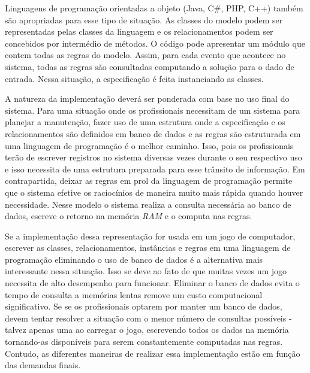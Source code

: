 Linguagens de programação orientadas a objeto (Java, C$\#$, PHP, C++) também são apropriadas para esse tipo de situação. As classes do modelo podem ser representadas pelas classes da linguagem e os relacionamentos podem ser concebidos por intermédio de métodos. O código pode apresentar um módulo que contem todas as regras do modelo. Assim, 
para cada evento que acontece no sistema, todas as regras são consultadas computando a solução para o dado de entrada. Nessa situação, a especificação é feita instanciando as classes. 

A natureza da implementação deverá ser ponderada com base no uso final do sistema. Para uma situação onde os profissionais necessitam de um sistema para planejar a manutenção, fazer uso de uma estrutura onde a especificação e os relacionamentos são definidos em banco de dados e as regras são estruturada em uma linguagem de programação é o melhor caminho. Isso, pois os profissionais terão de escrever registros no sistema diversas vezes durante o seu respectivo uso e isso necessita de uma estrutura preparada para esse trânsito de informação. Em contrapartida, deixar as regras em prol da linguagem de programação permite que o sistema efetive os raciocínios de maneira muito mais rápida quando houver necessidade. Nesse modelo o sistema realiza a consulta necessária ao banco de dados, escreve o retorno na memória \textit{RAM} e o computa
nas regras. 

Se a implementação dessa representação for usada em um jogo de computador, escrever as classes, relacionamentos, instâncias e regras em uma linguagem de programação eliminando o uso de banco de dados é a alternativa mais interessante nessa situação. Isso se deve ao fato de que muitas vezes um jogo necessita de alto desempenho para funcionar. Eliminar o banco de dados evita o tempo de consulta a memórias lentas remove um custo computacional significativo. Se se os profissionais optarem por manter um banco de dados, devem tentar resolver a situação com o menor número de consultas possíveis - talvez apenas uma ao carregar o jogo, escrevendo todos os dados na memória tornando-as disponíveis para serem constantemente computadas nas regras. Contudo, as diferentes maneiras de realizar essa implementação estão em função das demandas finais. 